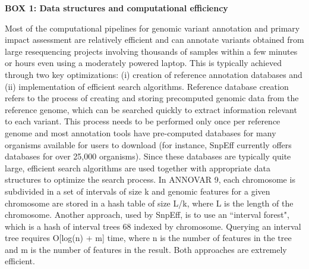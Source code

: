 \textbf{BOX 1: Data structures and computational efficiency}
\begin{framed}
Most of the computational pipelines for genomic variant annotation and primary impact assessment are relatively efficient and can annotate variants obtained from large resequencing projects involving thousands of samples within a few minutes or hours even using a moderately powered laptop. This is typically achieved through two key optimizations: (i) creation of reference annotation databases and (ii) implementation of efficient search algorithms. Reference database creation refers to the process of creating and storing precomputed genomic data from the reference genome, which can be searched quickly to extract information relevant to each variant. This process needs to be performed only once per reference genome and most annotation tools have pre-computed databases for many organisms available for users to download (for instance, SnpEff currently offers databases for over 25,000 organisms). Since these databases are typically quite large, efficient search algorithms are used together with appropriate data structures to optimize the search process. In ANNOVAR 9, each chromosome is subdivided in a set of intervals of size k and genomic features for a given chromosome are stored in a hash table of size L/k, where L is the length of the chromosome. Another approach, used by SnpEff, is to use an ``interval forest", which is a hash of interval trees 68 indexed by chromosome. Querying an interval tree requires O[log(n) + m] time, where n is the number of features in the tree and m is the number of features in the result. Both approaches are extremely efficient.
\end{framed}

